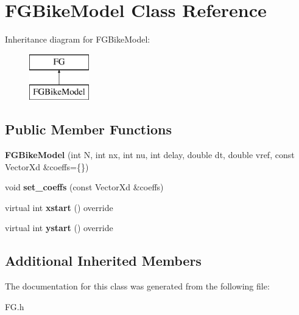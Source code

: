 \hypertarget{classFGBikeModel}{}\section{F\+G\+Bike\+Model Class Reference}
\label{classFGBikeModel}
Inheritance diagram for F\+G\+Bike\+Model\+:\begin{figure}[H]
\begin{center}
\leavevmode
\includegraphics[height=2.000000cm]{classFGBikeModel}
\end{center}
\end{figure}
\subsection*{Public Member Functions}
\begin{DoxyCompactItemize}
\item 
\mbox{\label{classFGBikeModel_a636102132fb62dbaefadf39f0684b752}} 
{\bfseries F\+G\+Bike\+Model} (int N, int nx, int nu, int delay, double dt, double vref, const Vector\+Xd \&coeffs=\{\})
\item 
\mbox{\label{classFGBikeModel_a20a1e766e8f6cb8b4cc59f796c18574f}} 
void {\bfseries set\+\_\+coeffs} (const Vector\+Xd \&coeffs)
\item 
\mbox{\label{classFGBikeModel_a74d94e64401b6a4aea4d0d1b40dd6edc}} 
virtual int {\bfseries xstart} () override
\item 
\mbox{\label{classFGBikeModel_a0ad1fe4d072d1a5ed09c31633a47f39a}} 
virtual int {\bfseries ystart} () override
\end{DoxyCompactItemize}
\subsection*{Additional Inherited Members}


The documentation for this class was generated from the following file\+:\begin{DoxyCompactItemize}
\item 
F\+G.\+h\end{DoxyCompactItemize}
